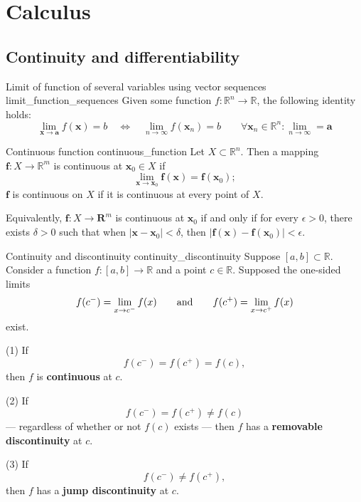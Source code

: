 \section{Calculus}

\subsection{Continuity and differentiability}

\begin{theorem}{Limit of function of several variables using vector sequences \cite{math2111_notes}}{limit_function_sequences}
Given some function $f : \mathbb{R}^n \to \mathbb{R}$, the following identity holds:
$$
    \lim_{\mathbf{x} \to \mathbf{a}} f(\mathbf{x}) = b \quad
    \iff \quad \lim_{n \to \infty} f(\mathbf{x}_n) = b \qquad
    \forall \mathbf{x}_n \in \mathbb{R}^n : \lim_{n \to \infty} = \mathbf{a}
$$
\end{theorem}

\begin{definition}{Continuous function \cite{hubbard_hubbard}}{continuous_function}
Let $X \subset \mathbb{R}^n$. Then a mapping $\mathbf{f} : X \to \mathbb{R}^m$ is continuous at $\mathbf{x}_0 \in X$ if
$$ \lim_{\mathbf{x} \to \mathbf{x}_0} \mathbf{f}(\mathbf{x}) = \mathbf{f}(\mathbf{x}_0); $$
$\mathbf{f}$ is continuous on $X$ if it is continuous at every point of $X$.

Equivalently, $\mathbf{f}: X \to \mathbf{R}^m$ is continuous at $\mathbf{x}_0$ if and only if for every $\epsilon > 0$, there exists $\delta > 0$ such that when $|\mathbf{x} - \mathbf{x}_0| < \delta$, then $|\mathbf{f}(\mathbf{x}) - \mathbf{f}(\mathbf{x}_0)| < \epsilon$.
\end{definition}

\begin{definition}{Continuity and discontinuity \cite{math2111_notes}}{continuity_discontinuity}
Suppose $[a, b] \subset \mathbb{R}$. Consider a function $f : [a, b] \to \mathbb{R}$ and a point $c \in \mathbb{R}$. Supposed the one-sided limits
$$ f(c^-) = \lim_{x \to c^-} f(x) \qquad \textnormal{and} \qquad f(c^+) = \lim_{x \to c^+} f(x) $$
exist.

(1) If
$$ f(c^-) = f(c^+) = f(c) , $$
then $f$ is \textbf{continuous} at $c$.

(2) If
$$ f(c^-) = f(c^+) \not= f(c) $$
--- regardless of whether or not $f(c)$ exists --- then $f$ has a \textbf{removable discontinuity} at $c$.

(3) If
$$ f(c^-) \not= f(c^+) , $$
then $f$ has a \textbf{jump discontinuity} at $c$.
\end{definition}

